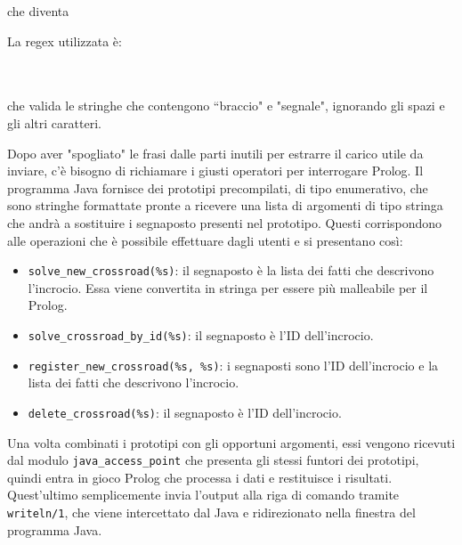 \mbox{}
\begin{flushleft}
	che diventa
\end{flushleft}
\par \mbox{}

\begin{flushleft}
	La regex utilizzata è:
\end{flushleft}

\par \mbox{} \\\\
che valida le stringhe che contengono ``braccio" e "segnale", ignorando gli spazi e gli altri caratteri.

Dopo aver "spogliato" le frasi dalle parti inutili per estrarre il carico utile da inviare, c'è bisogno di richiamare i giusti operatori per interrogare Prolog. Il programma Java fornisce dei prototipi precompilati, di tipo enumerativo, che sono stringhe formattate pronte a ricevere una lista di argomenti di tipo stringa che andrà a sostituire i segnaposto presenti nel prototipo. Questi corrispondono alle operazioni che è possibile effettuare dagli utenti e si presentano così:
\begin{itemize}
	\item \texttt{solve\_new\_crossroad(\%s)}: il segnaposto è la lista dei fatti che descrivono l'incrocio. Essa viene convertita in stringa per essere più malleabile per il Prolog.
	\item \texttt{solve\_crossroad\_by\_id(\%s)}: il segnaposto è l'ID dell'incrocio.
	\item \texttt{register\_new\_crossroad(\%s, \%s)}: i segnaposti sono l'ID dell'incrocio e la lista dei fatti che descrivono l'incrocio.
	\item \texttt{delete\_crossroad(\%s)}: il segnaposto è l'ID dell'incrocio.
\end{itemize}

Una volta combinati i prototipi con gli opportuni argomenti, essi vengono ricevuti dal modulo \texttt{java\_access\_point} che presenta gli stessi funtori dei prototipi, quindi entra in gioco Prolog che processa i dati e restituisce i risultati. Quest'ultimo semplicemente invia l'output alla riga di comando tramite \texttt{writeln/1}, che viene intercettato dal Java e ridirezionato nella finestra del programma Java.
